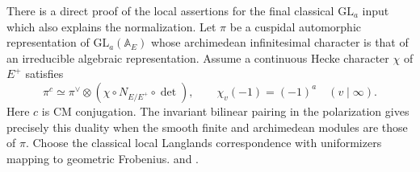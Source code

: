 There is a direct proof of the local assertions for the final classical
$\mathrm{GL}_a$ input which also explains the normalization. Let $\pi$
be a cuspidal automorphic representation of $\mathrm{GL}_a(\mathbb A_E)$
whose archimedean infinitesimal character is that of an irreducible
algebraic representation. Assume a continuous Hecke character $\chi$
of $E^+$ satisfies
\[
 \pi^c\simeq\pi^\vee\otimes(\chi\circ N_{E/E^+}\circ\det),
 \qquad \chi_v(-1)=(-1)^a\quad(v\mid\infty).
\]
Here $c$ is CM conjugation. The invariant bilinear pairing in the
polarization gives precisely this duality when the smooth finite and
archimedean modules are those of $\pi$. Choose the classical local
Langlands correspondence with uniformizers mapping to geometric Frobenius.
and .

